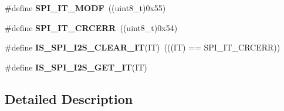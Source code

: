 \begin{DoxyCompactItemize}
\item 
\hypertarget{group___s_p_i___i2_s__interrupts__definition_ga0b9780d5f31fd80f4d0fa7d6860041e9}{\#define {\bfseries S\-P\-I\-\_\-\-I\-T\-\_\-\-M\-O\-D\-F}~((uint8\-\_\-t)0x55)}\label{group___s_p_i___i2_s__interrupts__definition_ga0b9780d5f31fd80f4d0fa7d6860041e9}

\item 
\hypertarget{group___s_p_i___i2_s__interrupts__definition_ga9aa97a5ce8d3500dc14ca4e30eada199}{\#define {\bfseries S\-P\-I\-\_\-\-I\-T\-\_\-\-C\-R\-C\-E\-R\-R}~((uint8\-\_\-t)0x54)}\label{group___s_p_i___i2_s__interrupts__definition_ga9aa97a5ce8d3500dc14ca4e30eada199}

\item 
\hypertarget{group___s_p_i___i2_s__interrupts__definition_gabeb917a0a708af0439f753a5f4af4c5e}{\#define {\bfseries I\-S\-\_\-\-S\-P\-I\-\_\-\-I2\-S\-\_\-\-C\-L\-E\-A\-R\-\_\-\-I\-T}(I\-T)~(((I\-T) == S\-P\-I\-\_\-\-I\-T\-\_\-\-C\-R\-C\-E\-R\-R))}\label{group___s_p_i___i2_s__interrupts__definition_gabeb917a0a708af0439f753a5f4af4c5e}

\item 
\#define {\bfseries I\-S\-\_\-\-S\-P\-I\-\_\-\-I2\-S\-\_\-\-G\-E\-T\-\_\-\-I\-T}(I\-T)
\end{DoxyCompactItemize}


\subsection{Detailed Description}


